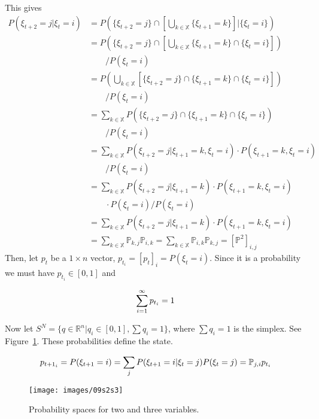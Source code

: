 This gives
\begin{align*}
P\left(\xi_{t+2}=j | \xi_t=i\right) &= P\left(\{\xi_{t+2}=j\} \cap \left[\bigcup_{k\in\mathbb{X}}\{\xi_{t+1}=k\}\right] | \{\xi_t=i\}\right) \\
&= P\left(\{\xi_{t+2}=j\} \cap \left[\bigcup_{k\in\mathbb{X}}\{\xi_{t+1}=k\} \cap \{\xi_t=i\}\right]\right) \\
&\qquad / P(\xi_t=i) \\
&= P\left(\bigcup_{k\in\mathbb{X}}[\{\xi_{t+2}=j\} \cap \{\xi_{t+1}=k\} \cap \{\xi_t=i\}]\right) \\
&\qquad / P(\xi_t=i) \\
&= \sum_{k\in\mathbb{X}} P(\{\xi_{t+2}=j\} \cap \{\xi_{t+1}=k\} \cap \{\xi_t=i\}) \\
&\qquad / P(\xi_t=i) \\
&= \sum_{k\in\mathbb{X}} P(\xi_{t+2}=j | \xi_{t+1}=k,\xi_t=i) \cdot P(\xi_{t+1}=k,\xi_t=i) \\
&\qquad / P(\xi_t=i) \\
&= \sum_{k\in\mathbb{X}} P(\xi_{t+2}=j | \xi_{t+1}=k) \cdot P(\xi_{t+1}=k,\xi_t=i) \\
&\qquad \cdot P(\xi_t=i) / P(\xi_t=i) \\
&= \sum_{k\in\mathbb{X}} P(\xi_{t+2}=j | \xi_{t+1}=k) \cdot P(\xi_{t+1}=k,\xi_t=i) \\
&= \sum_{k\in\mathbb{X}} \mathbb{P}_{k,j}\mathbb{P}_{i,k} = \sum_{k\in\mathbb{X}} \mathbb{P}_{i,k}\mathbb{P}_{k,j} = {\left[\mathbb{P}^2\right]}_{i,j}
\end{align*}
Then, let $p_t$ be a $1\times n$ vector, $p_{t_i}={[p_t]}_i=P(\xi_t=i)$.
Since it is a probability we must have $p_{t_i}\in[0,1]$ and

\begin{equation*}
\sum_{i=1}^\infty p_{t_i}=1
\end{equation*}

Now let $S^N=\{q\in\mathbb{R}^n|q_i\in[0,1],\sum q_i=1\}$, where $\sum q_i=1$ is the simplex.
See Figure~\ref{fig:09s2s3}.
These probabilities define the state.

\begin{equation*}
p_{{t+1}_i} = P(\xi_{t+1}=i) = \sum_j P(\xi_{t+1}=i|\xi_t=j)P(\xi_t=j) = \mathbb{P}_{j,i} p_{t_i}
\end{equation*}

\begin{figure}[ht!]
\centering
\texttt{[image: images/09s2s3]}
\caption{Probability spaces for two and three variables.}%
\label{fig:09s2s3}
\end{figure}


